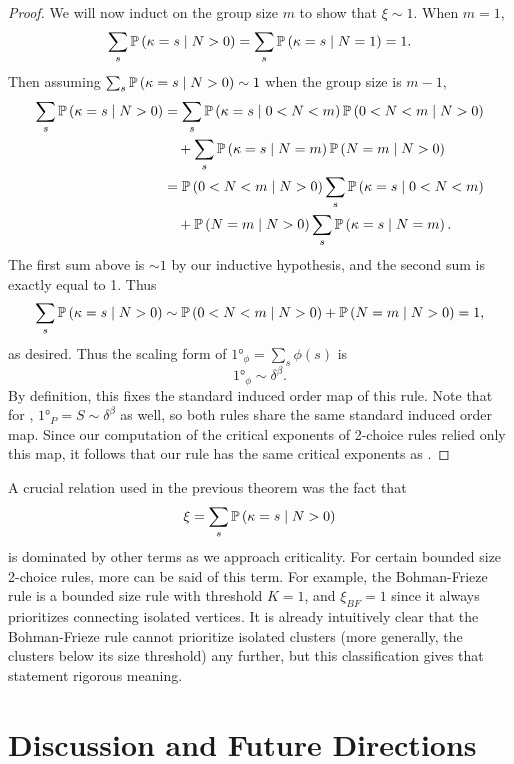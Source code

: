 \documentclass[twoside,10pt]{article}
\newcommand{\BF}{Bohman-Frieze\xspace}
\begin{document}
\begin{proof}
	We will now induct on the group size $m$ to show that $\xi \sim 1$. When $m=1$,
	\[
	\sum_{s} \P{ \kappa=s\;|\; N>0 } = \sum_{s}\P{ \kappa=s\;|\; N=1 } = 1.
	\] Then assuming $\sum_{s} \P{ \kappa=s\;|\; N>0 } \sim 1$ when the group size is $m-1$,
	\begin{align*}
		\sum_{s}\P{ \kappa=s\;|\; N>0 } &= \sum_{s}\P{ \kappa=s\;|\; 0<N<m }\P{ 0<N<m\;|\;N>0 } \\
							 &\quad + \sum_{s} \P{ \kappa=s\;|\; N=m }\P{ N=m\;|\;N>0 } \\
							 &= \P{ 0<N<m\;|\; N>0 } \sum_{s} \P{ \kappa=s\;|\; 0<N<m } \\
							 &\quad + \P{ N=m\;|\;N>0 }\sum_{s}\P{ \kappa=s\;|\; N=m }.
	\end{align*}
	The first sum above is $\sim 1$ by our inductive hypothesis, and the second sum is exactly equal to 1. Thus
	\[
		\sum_{s}\P{ \kappa=s\;|\; N>0 } \sim \P{ 0<N<m\;|\; N>0 } + \P{ N=m\;|\;N>0 } = 1,
	\]
	as desired. Thus the scaling form of $\ang{1}_{\phi}=\sum_{s}\phi(s)$ is
	\[
	\ang{1}_{\phi} \sim \delta^{\beta}.
	\] 
	By definition, this fixes the standard induced order map of this rule. 	Note that for \ER, $\ang{1}_{P} = S \sim \delta^{\beta}$ as well, so both rules share the same standard induced order map. Since our computation of the critical exponents of 2-choice rules relied only this map, it follows that our rule has the same critical exponents as \ER.
\end{proof}

A crucial relation used in the previous theorem was the fact that
\[
\xi = \sum_{s} \P{ \kappa=s\;|\; N>0 }
\] is dominated by other terms as we approach criticality. For certain bounded size 2-choice rules, more can be said of this term. For example, the \BF rule is a bounded size rule with threshold $K=1$, and $\xi_{BF}= 1$ since it always prioritizes connecting isolated vertices. It is already intuitively clear that the \BF rule cannot prioritize isolated clusters (more generally, the clusters below its size threshold) any further, but this classification gives that statement rigorous meaning.


\section{Discussion and Future Directions}
\end{document}
